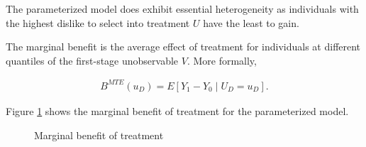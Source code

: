 \begin{boenumerate}
The parameterized model does exhibit essential heterogeneity as individuals with the highest dislike to select into treatment $U$ have the least to gain.

\item The marginal benefit is the average effect of treatment for individuals at different quantiles of the first-stage unobservable $V$. More formally,

\begin{align*}
    B^{MTE}(u_D) = E [Y_1 - Y_0 \mid U_D = u_D].
\end{align*}

Figure \ref{Marginal benefit of treatment} shows the marginal benefit of treatment for the parameterized model.

\begin{figure}[htp]\centering
\caption{Marginal benefit of treatment}\label{Marginal benefit of treatment}
\end{figure}


\end{boenumerate}

